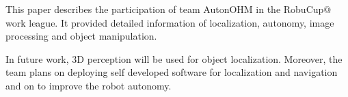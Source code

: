 
This paper describes the participation of team AutonOHM in the RobuCup$@$work league. It provided detailed information of localization, autonomy, image processing and object manipulation. 

In future work, 3D perception will be used for object localization. Moreover, the team plans on deploying self developed software for localization and navigation and on to improve the robot autonomy.
%
